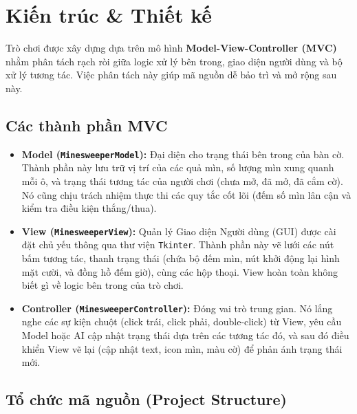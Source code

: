 \section{Kiến trúc \& Thiết kế}

Trò chơi được xây dựng dựa trên mô hình \textbf{Model-View-Controller (MVC)} nhằm phân tách rạch ròi giữa logic xử lý bên trong, giao diện người dùng và bộ xử lý tương tác. Việc phân tách này giúp mã nguồn dễ bảo trì và mở rộng sau này.

\subsection{Các thành phần MVC}

\begin{itemize}
    \item \textbf{Model (\texttt{MinesweeperModel}):}
    Đại diện cho trạng thái bên trong của bàn cờ. Thành phần này lưu trữ vị trí của các quả mìn, số lượng mìn xung quanh mỗi ô, và trạng thái tương tác của người chơi (chưa mở, đã mở, đã cắm cờ). Nó cũng chịu trách nhiệm thực thi các quy tắc cốt lõi (đếm số mìn lân cận và kiểm tra điều kiện thắng/thua).
    
    \item \textbf{View (\texttt{MinesweeperView}):}
    Quản lý Giao diện Người dùng (GUI) được cài đặt chủ yếu thông qua thư viện \texttt{Tkinter}. Thành phần này vẽ lưới các nút bấm tương tác, thanh trạng thái (chứa bộ đếm mìn, nút khởi động lại hình mặt cười, và đồng hồ đếm giờ), cùng các hộp thoại. View hoàn toàn không biết gì về logic bên trong của trò chơi.
    
    \item \textbf{Controller (\texttt{MinesweeperController}):}
    Đóng vai trò trung gian. Nó lắng nghe các sự kiện chuột (click trái, click phải, double-click) từ View, yêu cầu Model hoặc AI cập nhật trạng thái dựa trên các tương tác đó, và sau đó điều khiển View vẽ lại (cập nhật text, icon mìn, màu cờ) để phản ánh trạng thái mới.
\end{itemize}

\subsection{Tổ chức mã nguồn (Project Structure)}

